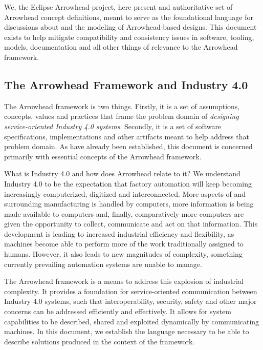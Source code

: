 %
%

We, the Eclipse Arrowhead project, here present and authoritative set of Arrowhead concept definitions, meant to serve as the foundational language for discussions about and the modeling of Arrowhead-based designs.
This document exists to help mitigate compatibility and consistency issues in software, tooling, models, documentation and all other things of relevance to the Arrowhead framework.

\subsection{The Arrowhead Framework and Industry 4.0}
\label{sec:introduction:arrowhead}

The Arrowhead framework is two things.
Firstly, it is a set of assumptions, concepts, values and practices that frame the problem domain of \textit{designing service-oriented Industry 4.0 systems}.
Secondly, it is a set of software specifications, implementations and other artifacts meant to help address that problem domain.
As have already been established, this document is concerned primarily with essential concepts of the Arrowhead framework.

What is Industry 4.0 and how does Arrowhead relate to it?
We understand Industry 4.0 to be the expectation that factory automation will keep becoming increasingly computerized, digitized and interconnected.
More aspects of and surrounding manufacturing is handled by computers, more information is being made available to computers and, finally, comparatively more computers are given the opportunity to collect, communicate and act on that information.
This development is leading to increased industrial efficiency and flexibility, as machines become able to perform more of the work traditionally assigned to humans.
However, it also leads to new magnitudes of complexity, something currently prevailing automation systems are unable to manage.

The Arrowhead framework is a means to address this explosion of industrial complexity.
It provides a foundation for service-oriented communication between Industry 4.0 systems, such that interoperability, security, safety and other major concerns can be addressed efficiently and effectively.
It allows for system capabilities to be described, shared and exploited dynamically by communicating machines.
In this document, we establish the language necessary to be able to describe solutions produced in the context of the framework.

